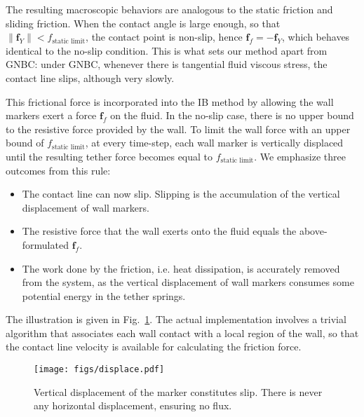 \documentclass{jfm}
\newcommand{\daniel}[1]{\todo[inline,color=yellow!40]{Daniel: #1}}
\newcommand{\charles}[1]{\todo[inline,color=blue!40]{Charles: #1}}
\begin{document}
The resulting macroscopic behaviors are analogous to the static friction and sliding friction. When the contact angle is large enough, so that $\|\bm{f}_Y\| < f_\text{static limit}$, the contact point is non-slip, hence $\bm{f}_f = -\bm{f}_Y$, which behaves identical to the no-slip condition. This is what sets our method apart from GNBC: under GNBC, whenever there is tangential fluid viscous stress, the contact line slips, although very slowly. 

This frictional force is incorporated into the IB method by allowing the wall markers exert a force $\bm{f}_f$ on the fluid. In the no-slip case, there is no upper bound to the resistive force provided by the wall. To limit the wall force with an upper bound of $f_\text{static limit}$, at every time-step, each wall marker is vertically displaced until the resulting tether force becomes equal to $f_\text{static limit}$. We emphasize three outcomes from this rule: 
\begin{itemize}
    \item The contact line can now slip. Slipping is the accumulation of the vertical displacement of wall markers. 
    \item The resistive force that the wall exerts onto the fluid equals the above-formulated $\bm{f}_f$. 
    \item The work done by the friction, i.e. heat dissipation, is accurately removed from the system, as the vertical displacement of wall markers consumes some potential energy in the tether springs.
\end{itemize}
The illustration is given in Fig.~\ref{fig:displace}. The actual implementation involves a trivial algorithm that associates each wall contact with a local region of the wall, so that the contact line velocity is available for calculating the friction force. 
\begin{figure}
    \centering
    \texttt{[image: figs/displace.pdf]}
    \caption{
        Vertical displacement of the marker constitutes slip. There is never any horizontal displacement, ensuring no flux. 
    }
    \label{fig:displace}
\end{figure}
\end{document}

